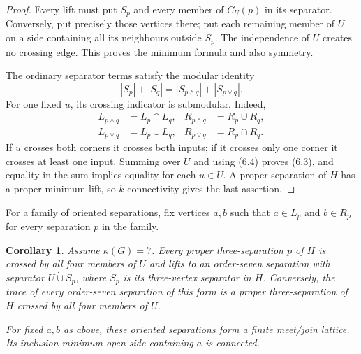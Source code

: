 \documentclass[11pt]{amsart}
\newtheorem{corollary}[theorem]{Corollary}
\begin{document}
\begin{proof}
Every lift must put $S_p$ and every member of $C_U(p)$ in its separator.
Conversely, put precisely those vertices there; put each remaining member
of $U$ on a side containing all its neighbours outside $S_p$.
The independence of $U$ creates no crossing edge.  This proves the minimum
formula and also symmetry.

The ordinary separator terms satisfy the modular identity
\[
 |S_p|+|S_q|=|S_{p\wedge q}|+|S_{p\vee q}|.            \tag{6.4}
\]
For one fixed $u$, its crossing indicator is submodular.  Indeed,
\[
\begin{aligned}
 L_{p\wedge q}&=L_p\cap L_q,&R_{p\wedge q}&=R_p\cup R_q,\\
 L_{p\vee q}&=L_p\cup L_q,&R_{p\vee q}&=R_p\cap R_q.
\end{aligned}
\]
If $u$ crosses both corners it crosses both inputs; if it crosses only one
corner it crosses at least one input.  Summing over $U$ and using (6.4)
proves (6.3), and equality in the sum implies equality for each $u\in U$.
A proper separation of $H$ has a proper minimum lift, so $k$-connectivity
gives the last assertion.
\end{proof}

For a family of oriented separations, fix vertices $a,b$ such that
$a\in L_p$ and $b\in R_p$ for every separation $p$ in the family.

\begin{corollary}\label{cor:four-centre-lattice}
Assume $\kappa(G)=7$.  Every proper three-separation $p$ of $H$ is crossed
by all four members of $U$ and lifts to an order-seven separation with
separator $U\mathbin{\dot\cup}S_p$, where $S_p$ is its three-vertex
separator in $H$.  Conversely, the trace of every order-seven separation of
this form is a proper three-separation of $H$ crossed by all four members of
$U$.

For fixed $a,b$ as above, these oriented separations form a finite meet/join
lattice.  Its inclusion-minimum open side containing $a$ is connected.
\end{corollary}
\end{document}
